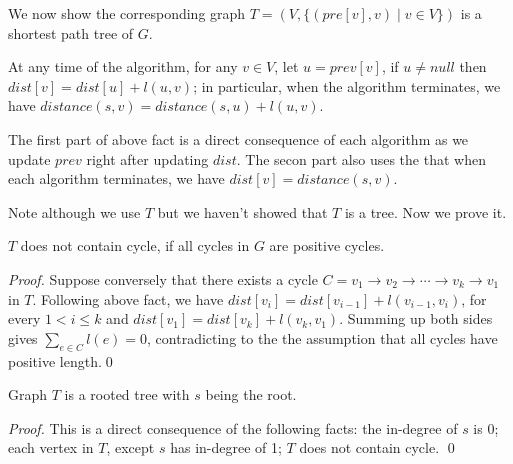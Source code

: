 \begin{minipage}{0.8\textwidth}
	\xxx
	\xxx
	\xxx
	\aab {\textcolor{blue}{$prev[v] = null$, for any $v\in V$};}\xxx
	\xxx
	\xxx
	\xxx
	\xxx
	\xxx
	\xxx
\end{minipage}

\begin{minipage}{0.8\textwidth}
	\xxx
	\xxx
	\xxx
	\aac {\textcolor{blue}{$prev[v]= u$};}\xxx
	\xxx
	\xxx
\end{minipage}


We now show the corresponding graph $T = (V, \{(pre[v], v)\mid v\in V\})$ is a shortest path tree of $G$.

\begin{fact}
\label{tree-fact2}
At any time of the algorithm, for any $v\in V$, let $u = prev[v]$, if $u\neq null$ then $dist[v] = dist[u] + l(u,v)$;
in particular, when the algorithm terminates, we have $distance(s,v) = distance(s,u) + l(u,v)$.
\end{fact}
The first part of above fact is a direct consequence of each algorithm as we update $prev$ right after updating $dist$.
The secon part also uses the that when each algorithm terminates, we have $dist[v] = distance(s,v)$.

Note although we use $T$ but we haven't showed that $T$ is a tree.  Now we prove it. 
\begin{fact}
$T$ does not contain cycle, if all cycles in $G$ are positive cycles.
\end{fact}
\emph{Proof.} Suppose conversely that there exists a cycle $C = v_1\to v_2\to \cdots \to v_k\to v_1$ in $T$.
Following above fact, we have $dist[v_i] = dist[v_{i-1}] + l(v_{i-1},v_i)$, for every $1 < i \le k$
and $dist[v_1] = dist[v_k] + l(v_k,v_1)$.
Summing up both sides gives $\sum_{e\in C} l(e) = 0$, contradicting to the the assumption
that all cycles have positive length.\qed

\begin{fact}
Graph $T$ is a rooted tree with $s$ being the root.
\end{fact}
\emph{Proof.} This is a direct consequence of the following facts: the in-degree of $s$ is 0; each vertex in $T$, except $s$
has in-degree of 1; $T$ does not contain cycle. \qed

